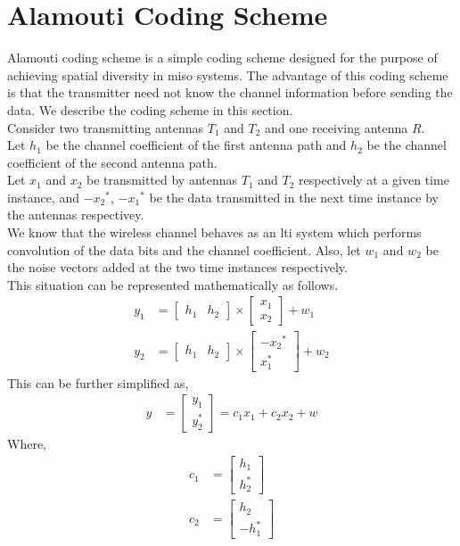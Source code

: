 \section{Alamouti Coding Scheme}
Alamouti coding scheme is a simple coding scheme designed for the purpose of achieving \gls{spatial diversity} in \acrshort{miso} systems. The advantage of this coding scheme is that the transmitter need not know the channel information before sending the data. We describe the coding scheme in this section.\\
Consider two transmitting antennas $T_1$ and $T_2$ and one receiving antenna $R$.\\
Let $h_1$ be the channel coefficient of the first antenna path and $h_2$ be the channel coefficient of the second antenna path.\\
Let $x_1$ and $x_2$ be transmitted by antennas $T_1$ and $T_2$ respectively at a given time instance, and ${-x_2}^*$, ${-x_1}^*$ be the data transmitted in the next time instance by the antennas respectivey.\\
We know that the wireless channel behaves as an \acrshort{lti} system which performs convolution of the data bits and the channel coefficient. Also, let $w_1$ and $w_2$ be the noise vectors added at the two time instances respectively.\\
This situation can be represented mathematically as follows.
\begin{align*}
y_1 &= 
\begin{bmatrix}
h_1&h_2
\end{bmatrix}
\times
\begin{bmatrix}
x_1\\
x_2
\end{bmatrix}
+ w_1\\
y_2 &=
\begin{bmatrix}
h_1&h_2
\end{bmatrix}
\times
\begin{bmatrix}
{-x_2}^*\\
x_1^*
\end{bmatrix}
+w_2
\end{align*}
This can be further simplified as,\\
\begin{align*}
y &= \begin{bmatrix}
y_1\\
y_2^*
\end{bmatrix}
= c_1x_1 + c_2x_2 + w
\end{align*}
Where,
\begin{align*}
c_1&=\begin{bmatrix}
h_1\\
h_2^*
\end{bmatrix}\\
c_2&=\begin{bmatrix}
h_2\\
-h_1^*
\end{bmatrix}
\end{align*}

